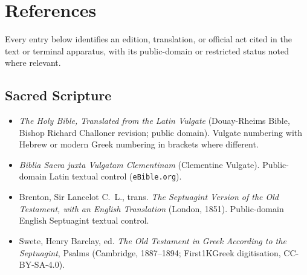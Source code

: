 \section{References}
\label{app:references}

Every entry below identifies an edition, translation, or official act cited in the text or terminal apparatus, with its public-domain or restricted status noted where relevant.

\subsection{Sacred Scripture}
\begin{itemize}
\item \emph{The Holy Bible, Translated from the Latin Vulgate} (Douay-Rheims Bible, Bishop Richard Challoner revision; public domain). Vulgate numbering with Hebrew or modern Greek numbering in brackets where different.
\item \emph{Biblia Sacra juxta Vulgatam Clementinam} (Clementine Vulgate). Public-domain Latin textual control (\texttt{eBible.org}).
\item Brenton, Sir Lancelot C.~L., trans. \emph{The Septuagint Version of the Old Testament, with an English Translation} (London, 1851). Public-domain English Septuagint textual control.
\item Swete, Henry Barclay, ed. \emph{The Old Testament in Greek According to the Septuagint}, Psalms (Cambridge, 1887--1894; First1KGreek digitisation, CC-BY-SA-4.0).
\end{itemize}

